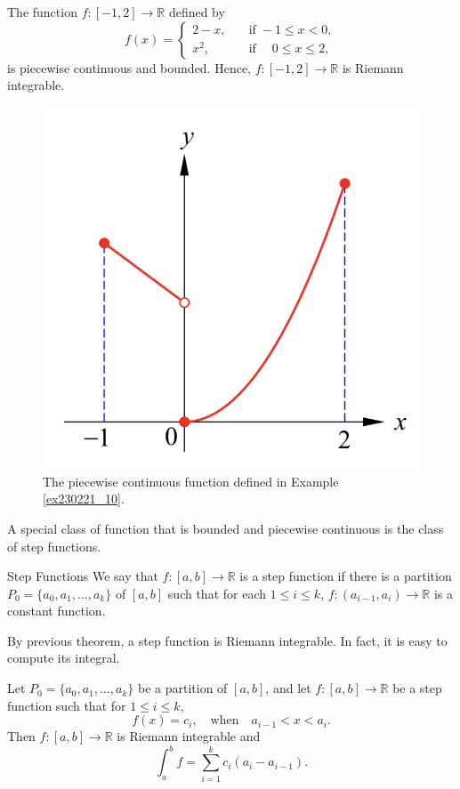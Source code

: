 \begin{example}[label=ex230221_10]{}
The function $f:[-1, 2]\to\mathbb{R}$ defined by
\[f(x)=\begin{cases} 2-x,\quad &\text{if}\; -1\leq x<0,\\
x^2,\quad &\text{if}\; \quad 0\leq x\leq 2,\end{cases}\]is piecewise continuous and bounded. Hence,  $f:[-1, 2]\to\mathbb{R}$ is Riemann integrable.
\end{example}

 \begin{figure}[ht]
\centering
\includegraphics[scale=0.2]{Picture42.png}
\caption{The piecewise continuous function defined in Example \ref{ex230221_10}.\fa}\label{figure42}
\end{figure}
A special class of function that is bounded and piecewise continuous is the class of step functions. 
\begin{definition}{Step Functions}
We say that   $f:[a,b]\to\mathbb{R}$ is a step function if there is a partition $P_0=\{a_0, a_1, \ldots, a_k\}$ of $[a,b]$ such that for each $1\leq i\leq k$, $f:(a_{i-1}, a_i)\to\mathbb{R}$ is a constant function.
\end{definition}
By previous theorem, a step function is Riemann integrable. In fact, it is easy to compute its integral.
\begin{proposition}{}
Let $P_0=\{a_0, a_1, \ldots, a_k\}$ be a partition of $[a,b]$, and let $f:[a,b]\to\mathbb{R}$ be a step function such that for $1\leq i\leq k$,
\[f(x)=c_i,\quad\text{when}\quad a_{i-1}< x< a_i.\] Then $f:[a,b]\to\mathbb{R}$  is Riemann integrable  and
\[\int_a^b f=\sum_{i=1}^k c_i(a_i-a_{i-1}).\]
\end{proposition}

